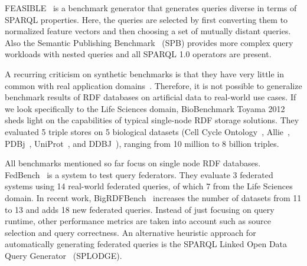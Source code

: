 FEASIBLE~\cite{saleem2015feasible} is a benchmark generator that generates queries diverse in terms of SPARQL properties. Here, the queries are selected by first converting them to normalized feature vectors and then choosing a set of mutually distant queries. Also the Semantic Publishing Benchmark~\cite{kotsevbenchmarking} (SPB) provides more complex query workloads with nested queries and all SPARQL 1.0 operators are present.

A recurring criticism on synthetic benchmarks is that they have very little in common with real application domains~\cite{DBLP:conf/sigmod/DuanKSU11}. Therefore, it is not possible to generalize benchmark results of RDF databases on artificial data to real-world use cases.
If we look specifically to the Life Sciences domain, BioBenchmark Toyama 2012~\cite{wu2014biobenchmark} sheds light on the capabilities of typical single-node RDF storage solutions. They evaluated 5 triple stores on 5 biological datasets (Cell Cycle Ontology~\cite{antezana2009cell}, Allie~\cite{yamamoto2011allie}, PDBj~\cite{kinjo2011protein}, UniProt~\cite{uniprot2014uniprot}, and DDBJ~\cite{tateno2002dna}), ranging from 10 million to 8 billion triples.

All benchmarks mentioned so far focus on single node RDF databases. FedBench~\cite{Schmidt2011} is a system to test query federators. They evaluate 3 federated systems using 14 real-world federated queries, of which 7 from the Life Sciences domain. In recent work, BigRDFBench~\cite{Saleem} increases the number of datasets from 11 to 13 and adds 18 new federated queries. Instead of just focusing on query runtime, other performance metrics are taken into account such as source selection and query correctness. An alternative heuristic approach for automatically generating federated queries is the SPARQL Linked Open Data Query Generator~\cite{gorlitz2012splodge} (SPLODGE).


